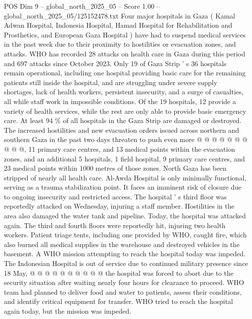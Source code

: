 \begin{textsample}{POS Dim 9 – global\_north\_2025\_05 – Score 1.00 – global\_north\_2025\_05/125152478.txt}  \label{ex:f9_pos_272}
Four major hospitals in Gaza ( Kamal Adwan Hospital, Indonesia Hospital, Hamad Hospital for Rehabilitation and Prosthetics, and European Gaza Hospital ) have had to suspend medical services in the past week due to their proximity to hostilities or evacuation zones, and attacks.
WHO has recorded 28 attacks on health care in Gaza during this period and 697 attacks since October 2023.
Only 19 of Gaza Strip ' s 36 hospitals remain operational, including one hospital providing basic care for the remaining patients still inside the hospital, and are struggling under severe supply shortages, lack of health workers, persistent insecurity, and a surge of casualties, all while staff work in impossible conditions.
Of the 19 hospitals, 12 provide a variety of health services, while the rest are only able to provide basic emergency care.
At least 94 \% of all hospitals in the Gaza Strip are damaged or destroyed.
The increased hostilities and new evacuation orders issued across northern and southern Gaza in the past two days threaten to push even more @ @ @ @ @ @ @ @ @ @, 11 primary care centres, and 13 medical points within the evacuation zones, and an additional 5 hospitals, 1 field hospital, 9 primary care centres, and 23 medical points within 1000 metres of those zones.
North Gaza has been stripped of nearly all health care.
Al-Awda Hospital is only minimally functional, serving as a trauma stabilization point.
It faces an imminent risk of closure due to ongoing insecurity and restricted access.
The hospital ' s third floor was reportedly attacked on Wednesday, injuring a staff member.
Hostilities in the area also damaged the water tank and pipeline.
Today, the hospital was attacked again.
The third and fourth floors were reportedly hit, injuring two health workers.
Patient triage tents, including one provided by WHO, caught fire, which also burned all medical supplies in the warehouse and destroyed vehicles in the basement.
A WHO mission attempting to reach the hospital today was impeded.
The Indonesian Hospital is out of service due to continued military presence since 18 May, @ @ @ @ @ @ @ @ @ @ the hospital was forced to abort due to the security situation after waiting nearly four hours for clearance to proceed.
WHO team had planned to deliver food and water to patients, assess their conditions, and identify critical equipment for transfer.
WHO tried to reach the hospital again today, but the mission was impeded.

\end{textsample}
